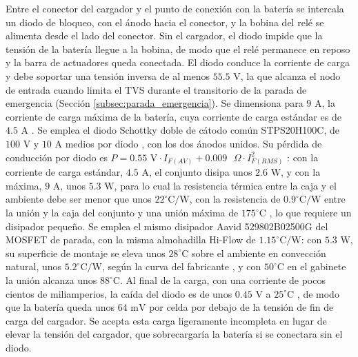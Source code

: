 \documentclass[../../General.tex]{subfiles}
\begin{document}
Entre el conector del cargador y el punto de conexión con la batería se intercala un diodo de bloqueo, con el ánodo hacia el conector, y la bobina del relé se alimenta desde el lado del conector. Sin el cargador, el diodo impide que la tensión de la batería llegue a la bobina, de modo que el relé permanece en reposo y la barra de actuadores queda conectada. El diodo conduce la corriente de carga y debe soportar una tensión inversa de al menos $55.5\text{ V}$, la que alcanza el nodo de entrada cuando limita el TVS durante el transitorio de la parada de emergencia (Sección \ref{subsec:parada_emergencia}). Se dimensiona para $9\text{ A}$, la corriente de carga máxima de la batería, cuya corriente de carga estándar es de $4.5\text{ A}$ \citep{cmbatteries_7s3p}.
Se emplea el diodo Schottky doble de cátodo común STPS20H100C, de $100\text{ V}$ y $10\text{ A}$ medios por diodo \citep{st_stps20h100c}, con los dos ánodos unidos. Su pérdida de conducción por diodo es $P = 0.55\text{ V} \cdot I_{F(AV)} + 0.009\text{ }\Omega \cdot I_{F(RMS)}^2$ \citep{st_stps20h100c}: con la corriente de carga estándar, $4.5\text{ A}$, el conjunto disipa unos $2.6\text{ W}$, y con la máxima, $9\text{ A}$, unos $5.3\text{ W}$, para lo cual la resistencia térmica entre la caja y el ambiente debe ser menor que unos $22^\circ\text{C/W}$, con la resistencia de $0.9^\circ\text{C/W}$ entre la unión y la caja del conjunto y una unión máxima de $175^\circ\text{C}$ \citep{st_stps20h100c}, lo que requiere un disipador pequeño. Se emplea el mismo disipador Aavid 529802B02500G del MOSFET de parada, con la misma almohadilla Hi-Flow de $1.15^\circ\text{C/W}$: con $5.3\text{ W}$, su superficie de montaje se eleva unos $28^\circ\text{C}$ sobre el ambiente en convección natural, unos $5.2^\circ\text{C/W}$, según la curva del fabricante \citep{aavid_heatsinks}, y con $50^\circ\text{C}$ en el gabinete la unión alcanza unos $88^\circ\text{C}$. Al final de la carga, con una corriente de pocos cientos de miliamperios, la caída del diodo es de unos $0.45\text{ V}$ a $25^\circ\text{C}$ \citep{st_stps20h100c}, de modo que la batería queda unos $64\text{ mV}$ por celda por debajo de la tensión de fin de carga del cargador. Se acepta esta carga ligeramente incompleta en lugar de elevar la tensión del cargador, que sobrecargaría la batería si se conectara sin el diodo.
\end{document}
